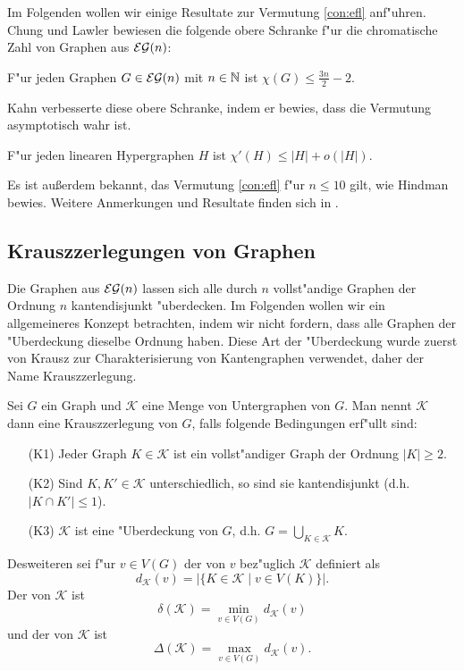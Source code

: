 Im Folgenden wollen wir einige Resultate zur Vermutung \ref{con:efl} anf"uhren. Chung und Lawler \cite{ChungL88} bewiesen die folgende obere Schranke f"ur die chromatische Zahl von Graphen aus ${\cal EG}(n)$:

\begin{theorem}
  F"ur jeden Graphen $G\in{\cal EG}(n)$ mit $n\in{\mathbb{N}}$ ist $\chi(G) \leq \frac{3n}{2}-2$.
  \label{thm:ChungLawler}
\end{theorem}

Kahn \cite{Kahn92} verbesserte diese obere Schranke, indem er bewies, dass die Vermutung asymptotisch wahr ist.
\begin{theorem}
  F"ur jeden linearen Hypergraphen $H$ ist $\chi'(H) \leq |H| + o(|H|)$.
  \label{thm:kahn}
\end{theorem}

Es ist au{\ss}erdem bekannt, das Vermutung \ref{con:efl} f"ur $n\leq 10$ gilt, wie Hindman \cite{Hindman81} bewies.
Weitere Anmerkungen und Resultate finden sich in \cite{RomeroS2007}.

\subsection{Krauszzerlegungen von Graphen}
Die Graphen aus ${\cal EG}(n)$ lassen sich alle durch $n$ vollst"andige Graphen der Ordnung $n$ kantendisjunkt "uberdecken. Im Folgenden wollen wir ein allgemeineres Konzept betrachten, indem wir nicht fordern, dass alle Graphen der "Uberdeckung dieselbe Ordnung haben. 
Diese Art der "Uberdeckung wurde zuerst von Krausz \cite{Krausz43} zur Charakterisierung von Kantengraphen verwendet, daher der Name Krauszzerlegung. 

Sei $G$ ein Graph und $\mathcal{K}$ eine Menge von Untergraphen von $G$. Man nennt $\mathcal{K}$ dann eine Krauszzerlegung von $G$, falls folgende Bedingungen erf"ullt sind:
\begin{enumerate}
  \item[\rm{(K1)}] Jeder Graph $K\in \mathcal{K}$ ist ein vollst"andiger Graph der Ordnung $|K| \geq 2$. 
  \item[\rm{(K2)}] Sind $K,K'\in \mathcal{K}$ unterschiedlich, so sind sie kantendisjunkt (d.h. $|K\cap K'| \leq 1$).
  \item[\rm{(K3)}] $\mathcal K$ ist eine "Uberdeckung von $G$, d.h.  $G=\bigcup\limits_{K\in \mathcal K}K$.
\end{enumerate}
Desweiteren sei f"ur $v\in V(G)$ der  von $v$ bez"uglich $\mathcal K$ definiert als $$d_{\mathcal{K}}(v) = |\{ K\in\mathcal K \;|\;  v \in V(K)\}|.$$ Der  von $\mathcal K$ ist $$\delta(\mathcal K) = \min\limits_{v\in V(G)}d_{\mathcal{K}}(v)$$ und der  von $\mathcal{K}$ ist $$\Delta(\mathcal{K}) = \max\limits_{v\in V(G)}d_{\mathcal{K}}(v).$$

